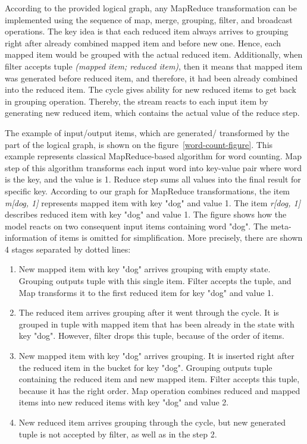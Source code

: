 According to the provided logical graph, any MapReduce transformation can be implemented using the sequence of map, merge, grouping, filter, and broadcast operations. The key idea is that each reduced item always arrives to grouping right after already combined mapped item and before new one. Hence, each mapped item would be grouped with the actual reduced item. Additionally, when filter accepts tuple {\it (mapped item; reduced item)}, then it means that mapped item was generated before reduced item, and therefore, it had been already combined into the reduced item. The cycle gives ability for new reduced items to get back in grouping operation. Thereby, the stream reacts to each input item by generating new reduced item, which contains the actual value of the reduce step. 

The example of input/output items, which are generated/ transformed by the part of the logical graph, is shown on the figure~\ref {word-count-figure}. This example represents classical MapReduce-based algorithm for word counting. Map step of this algorithm transforms each input word into key-value pair where word is the key, and the value is 1. Reduce step sums all values into the final result for specific key. According to our graph for MapReduce transformations, the item {\it m[dog, 1]} represents mapped item with key "dog" and value 1. The item {\it r[dog, 1]} describes reduced item with key "dog" and value 1. The figure shows how the model reacts on two consequent input items containing word "dog". The meta-information of items is omitted for simplification. More precisely, there are shown 4 stages separated by dotted lines:

\begin{enumerate}
    \item New mapped item with key "dog" arrives grouping with empty state. Grouping outputs tuple with this single item. Filter accepts the tuple, and Map transforms it to the first reduced item for key "dog" and value 1.
    \item The reduced item arrives grouping after it went through the cycle. It is grouped in tuple with mapped item that has been already in the state with key "dog". However, filter drops this tuple, because of the order of items.
    \item New mapped item with key "dog" arrives grouping. It is inserted right after the reduced item in the bucket for key "dog". Grouping outputs tuple containing the reduced item and new mapped item. Filter accepts this tuple, because it has the right order. Map operation combines reduced and mapped items into new reduced items with key "dog" and value 2.
    \item New reduced item arrives grouping through the cycle, but new generated tuple is not accepted by filter, as well as in the step 2.
\end{enumerate}

